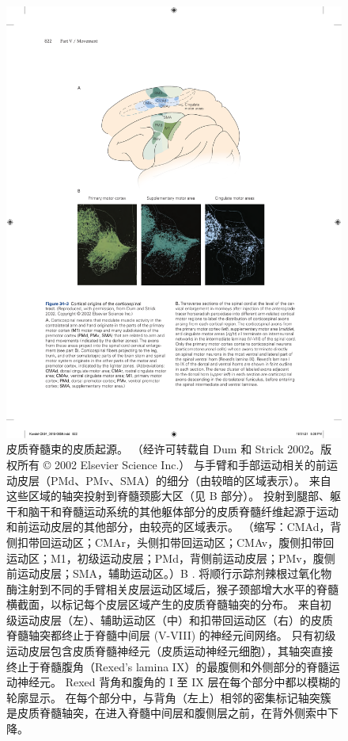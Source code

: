\begin{figure}[htbp]
	\centering
	\includegraphics[width=0.95\linewidth]{chap34/fig_34_3}
	\caption{皮质脊髓束的皮质起源。 （经许可转载自 Dum 和 Strick 2002。版权所有 © 2002 Elsevier Science Inc.） 与手臂和手部运动相关的前运动皮层（PMd、PMv、SMA）的细分（由较暗的区域表示）。 来自这些区域的轴突投射到脊髓颈膨大区（见 B 部分）。 投射到腿部、躯干和脑干和脊髓运动系统的其他躯体部分的皮质脊髓纤维起源于运动和前运动皮层的其他部分，由较亮的区域表示。 （缩写：CMAd，背侧扣带回运动区；CMAr，头侧扣带回运动区；CMAv，腹侧扣带回运动区；M1，初级运动皮层；PMd，背侧前运动皮层；PMv，腹侧前运动皮层；SMA，辅助运动区。）B . 将顺行示踪剂辣根过氧化物酶注射到不同的手臂相关皮层运动区域后，猴子颈部增大水平的脊髓横截面，以标记每个皮层区域产生的皮质脊髓轴突的分布。 来自初级运动皮层（左）、辅助运动区（中）和扣带回运动区（右）的皮质脊髓轴突都终止于脊髓中间层 (V-VIII) 的神经元间网络。 只有初级运动皮层包含皮质脊髓神经元（皮质运动神经元细胞），其轴突直接终止于脊髓腹角（Rexed's lamina IX）的最腹侧和外侧部分的脊髓运动神经元。 Rexed 背角和腹角的 I 至 IX 层在每个部分中都以模糊的轮廓显示。 在每个部分中，与背角（左上）相邻的密集标记轴突簇是皮质脊髓轴突，在进入脊髓中间层和腹侧层之前，在背外侧索中下降。}
	\label{fig:34_3}
\end{figure}


